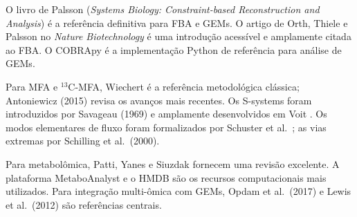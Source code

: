 O livro de Palsson \cite{palsson2015} (\textit{Systems Biology: Constraint-based Reconstruction
and Analysis}) é a referência definitiva para FBA e GEMs. O artigo de Orth, Thiele e Palsson
\cite{orth2010} no \textit{Nature Biotechnology} é uma introdução acessível e amplamente
citada ao FBA. O COBRApy \cite{ebrahim2013} é a implementação Python de referência para
análise de GEMs.

Para MFA e $^{13}$C-MFA, Wiechert \cite{wiechert2001} é a referência metodológica clássica;
Antoniewicz (2015) \cite{antoniewicz2015} revisa os avanços mais recentes. Os S-systems
foram introduzidos por Savageau (1969) \cite{savageau1969} e amplamente desenvolvidos em Voit
\cite{voit2013}. Os modos elementares de fluxo foram formalizados por Schuster et al.\
\cite{schuster1999}; as vias extremas por Schilling et al.\ (2000).

Para metabolômica, Patti, Yanes e Siuzdak \cite{patti2012} fornecem uma revisão excelente.
A plataforma MetaboAnalyst \cite{chong2019} e o HMDB \cite{wishart2022} são os recursos
computacionais mais utilizados. Para integração multi-ômica com GEMs, Opdam et al.\ (2017)
e Lewis et al.\ (2012) \cite{lewis2012} são referências centrais.

